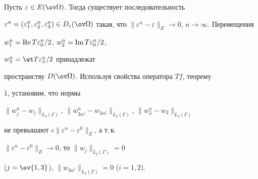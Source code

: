  


\begin{pf} 


Пусть $\varepsilon\in E(\ov\Omega)$. Тогда существует последовательность 


$\varepsilon^n= (\varepsilon^n_1, \varepsilon^n_2, \varepsilon^n_3)\in 


D_\varepsilon(\ov\Omega)$ такая, что $\|\varepsilon^n-\varepsilon\|_E\to 


0$, $n\to\infty$. Перемещения 


$w^n_1=\operatorname{Re} T\varepsilon^n_0/2$, $w^n_2=\operatorname{Im} T\varepsilon^n_0/2$, 


$w^n_3=\wt T\varepsilon^n_3/2$ принадлежат 


пространству $D(\ov\Omega)$. Используя свойства оператора $Tf$, теорему 


1, установим, что нормы 


$\|w^n_j-w_j\|_{L_2(\Gamma)}$, $\|w^n_{3\alpha^j}- 


w_{3\alpha^j}\|_{L_2(\Gamma)}$, $\|w^n_3-w_3\|_{L_2(\Gamma)}$ 


не превышают $c\|\varepsilon^n-\varepsilon^0\|_E$, а т.\,к. \linebreak


$\|\varepsilon^n-\varepsilon^0\|_E\to0$, то $\|w_j\|_{L_2(\Gamma)}=0$ 


($j=\ov{1,3}$), $\|w_{3\alpha^i}\|_{L_2(\Gamma)}=0$ ($i=1,2$). 


\end{pf} 





 


